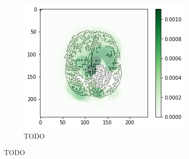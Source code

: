 \begin{figure}[H]
\begin{subfigure}{.33\textwidth}
        \includegraphics[width=\linewidth]{chapters/06_hdm/circle20/9.png}
        \caption{TODO}
    \end{subfigure}
    \caption{TODO}
\end{figure}


